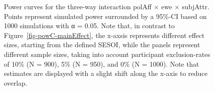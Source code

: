 \documentclass[
  letterpaper,
  DIV=11,
  numbers=noendperiod]{scrartcl}
\begin{document}
\begin{figure}


\caption{\label{fig-powC-threeWayInt}Power curves for the three-way
interaction polAff × ewe × subjAttr. Points represent simulated power
surrounded by a 95\%-CI based on 1000 simulations with α = 0.05. Note
that, in contrast to Figure~\ref{fig-powC-mainEffect}, the x-axsis
represents different effect sizes, starting from the defined SESOI,
while the panels represent different sample sizes, taking into account
participant exclusion-rates of 10\% (N = 900), 5\% (N = 950), and 0\% (N
= 1000). Note that estimates are displayed with a slight shift along the
x-axis to reduce overlap.}

\end{figure}%
\end{document}
